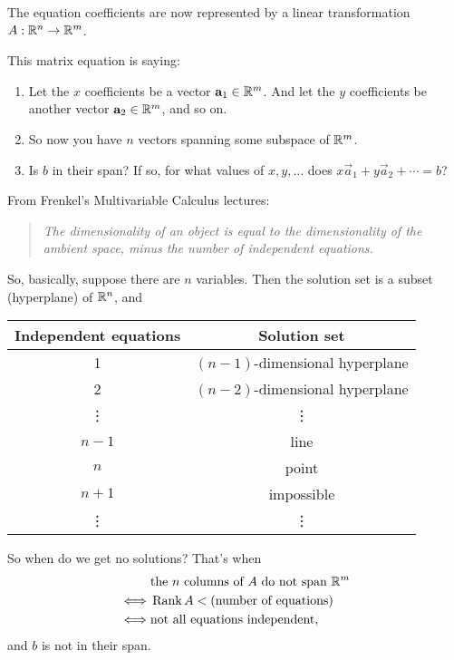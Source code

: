The equation coefficients are now represented by a linear transformation
$A:\mathbb{R}^n \to \mathbb{R}^m$.

This matrix equation is saying:
\begin{enumerate}
\item Let the $x$ coefficients be a vector $\mathbf a_1 \in \mathbb{R}^m$. And let the $y$
  coefficients be another vector $\mathbf a_2 \in \mathbb{R}^m$, and so on.
\item So now you have $n$ vectors spanning some subspace of $\mathbb{R}^m$.
\item Is $b$ in their span? If so, for what values of $x, y, \ldots$ does
  $x\vec a_1 + y\vec a_2 + \cdots = b$?
\end{enumerate}

From Frenkel's Multivariable Calculus lectures:

\begin{center}
  \begin{quote}
    \textit{The dimensionality of an object is equal to the dimensionality of the
      ambient space, minus the number of independent equations.}
  \end{quote}
\end{center}

So, basically, suppose there are $n$ variables. Then the solution set is a
subset (hyperplane) of $\mathbb{R}^n$, and

\begin{tabular}{c|c}
  Independent equations & Solution set\\
  \hline
  1                     & $(n - 1)$-dimensional hyperplane \\
  2                     & $(n - 2)$-dimensional hyperplane \\
  \vdots                & \vdots \\
  $n-1$                 & line \\
  $n$                   & point \\
  $n + 1$               & impossible \\
  \vdots                & \vdots
\end{tabular}

So when do we get no solutions? That's when
\begin{align*}
  &\text{the $n$ columns of $A$ do not span $\mathbb{R}^m$}\\
  \iff &\operatorname{\mathrm{Rank}} A < \text{(number of equations)}\\
  \iff &\text{not all equations independent},
\end{align*}
and $b$ is not in their span.

